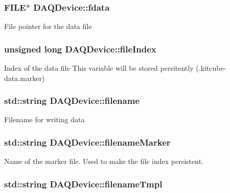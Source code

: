 \hypertarget{classDAQDevice_a0dcbda57c0b7b95d27a53ed5e1fabf59}{
\subsubsection[{fdata}]{\setlength{\rightskip}{0pt plus 5cm}F\-I\-L\-E$\ast$ D\-A\-Q\-Device\-::fdata\hspace{0.3cm}{\ttfamily [protected]}}}\label{classDAQDevice_a0dcbda57c0b7b95d27a53ed5e1fabf59}
File pointer for the data file \hypertarget{classDAQDevice_a68a1e79d4d2efd8592d566bacc1838f2}{
\subsubsection[{file\-Index}]{\setlength{\rightskip}{0pt plus 5cm}unsigned long D\-A\-Q\-Device\-::file\-Index\hspace{0.3cm}{\ttfamily [protected]}}}\label{classDAQDevice_a68a1e79d4d2efd8592d566bacc1838f2}
Index of the data file This variable will be stored persitently (.kitcube-\/data.\-marker) \hypertarget{classDAQDevice_a7f9cda7cf5b41f6b134c313477e9644b}{
\subsubsection[{filename}]{\setlength{\rightskip}{0pt plus 5cm}std\-::string D\-A\-Q\-Device\-::filename\hspace{0.3cm}{\ttfamily [protected]}}}\label{classDAQDevice_a7f9cda7cf5b41f6b134c313477e9644b}
Filename for writing data \hypertarget{classDAQDevice_a43ebbf069d065fdafba9aa9664ab76b1}{
\subsubsection[{filename\-Marker}]{\setlength{\rightskip}{0pt plus 5cm}std\-::string D\-A\-Q\-Device\-::filename\-Marker\hspace{0.3cm}{\ttfamily [protected]}}}\label{classDAQDevice_a43ebbf069d065fdafba9aa9664ab76b1}
Name of the marker file. Used to make the file index persistent. \hypertarget{classDAQDevice_a2abc939adabdc9bc9a88bd1db5dcfd08}{
\subsubsection[{filename\-Tmpl}]{\setlength{\rightskip}{0pt plus 5cm}std\-::string D\-A\-Q\-Device\-::filename\-Tmpl\hspace{0.3cm}{\ttfamily [private]}}}\label{classDAQDevice_a2abc939adabdc9bc9a88bd1db5dcfd08}
